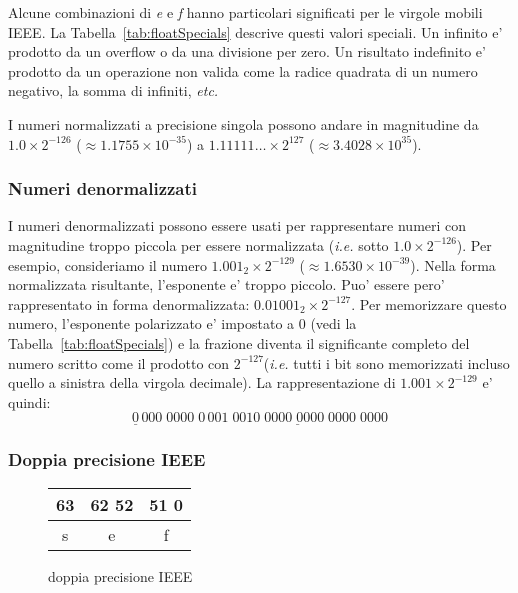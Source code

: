 Alcune combinazioni di \emph{e} e \emph{f} hanno particolari significati per
le virgole mobili IEEE. La Tabella~\ref{tab:floatSpecials} descrive questi
valori speciali. Un infinito e' prodotto da un overflow o da una divisione
per zero. Un risultato indefinito e' prodotto da un operazione non valida
come la radice quadrata di un numero negativo, la somma di infiniti, \emph{etc.} 

I numeri normalizzati a precisione singola possono andare in magnitudine da 
$1.0 \times 2^{-126}$ ($\approx 1.1755 \times 10^{-35}$) a 
$1.11111\ldots \times 2^{127}$ ($\approx 3.4028 \times 10^{35}$).

\subsubsection{Numeri denormalizzati}

I numeri denormalizzati possono essere usati per rappresentare numeri
con magnitudine troppo piccola per essere normalizzata (\emph{i.e.} sotto
$1.0 \times 2^{-126}$). Per esempio, consideriamo il numero $1.001_2 \times 
2^{-129}$ ($\approx 1.6530 \times 10^{-39}$). Nella forma normalizzata
risultante, l'esponente e' troppo piccolo. Puo' essere pero' rappresentato
in forma denormalizzata: $0.01001_2 \times 2^{-127}$. Per memorizzare
questo numero, l'esponente polarizzato e' impostato a 0 (vedi la Tabella~\ref{tab:floatSpecials}) e la frazione diventa il significante
completo del numero scritto come il prodotto con $2^{-127}$(\emph{i.e.} 
tutti i bit sono memorizzati incluso quello a sinistra della virgola decimale).
La rappresentazione di $1.001 \times 2^{-129}$ e' quindi:
\[ \underline{0}\,000\;0000\;0
   \,\underline{001\;0010\;0000\;0000\;0000\;0000} \]


\subsubsection{Doppia precisione IEEE}

\begin{figure}[t]
\centering
\begin{tabular}{|c|c|c|}
\multicolumn{1}{p{0.3cm}}{63} &
\multicolumn{1}{p{3cm}}{62 \hfill 52} &
\multicolumn{1}{p{7cm}}{51 \hfill 0} \\
\hline
s & e & f \\
\hline
\end{tabular}
\caption{doppia precisione IEEE\label{fig:IEEEdouble}}
\end{figure}

